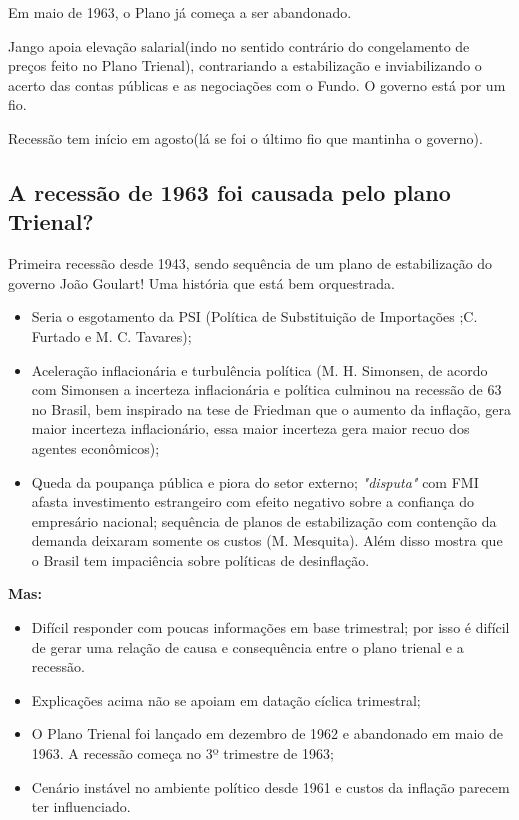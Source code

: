 \documentclass[a4paper,12pt]{article}[abntex2]
\begin{document}
Em maio de 1963, o Plano já começa a ser abandonado. 

Jango apoia elevação salarial(indo no sentido contrário do congelamento de preços feito no Plano Trienal), contrariando a estabilização e inviabilizando o acerto das contas públicas e as negociações com o Fundo. O governo está por um fio. 

Recessão tem início em agosto(lá se foi o último fio que mantinha o governo).

\subsection{\textbf{A recessão de 1963 foi causada pelo plano Trienal?}}
    
Primeira recessão desde 1943, sendo sequência de um plano de estabilização do governo João Goulart! Uma história que está bem orquestrada.

\begin{itemize}
    \item Seria o esgotamento da PSI (Política de Substituição de Importações ;C. Furtado e M. C. Tavares);
    \item Aceleração inflacionária e turbulência política (M. H. Simonsen, de acordo com Simonsen a incerteza inflacionária e política culminou na recessão de 63 no Brasil, bem inspirado na tese de Friedman que o aumento da inflação, gera maior incerteza inflacionário, essa maior incerteza gera maior recuo dos agentes econômicos);
    \item Queda da poupança pública e piora do setor externo; \textit{"disputa"} com FMI afasta investimento estrangeiro com efeito negativo sobre a confiança do empresário nacional; sequência de planos de estabilização com contenção da demanda deixaram somente os custos (M. Mesquita). Além disso mostra que o Brasil tem impaciência sobre políticas de desinflação.
\end{itemize}

\textbf{Mas:}
\begin{itemize}
    \item Difícil responder com poucas informações em base trimestral; por isso é difícil de gerar uma relação de causa e consequência entre o plano trienal e a recessão.
    \item Explicações acima não se apoiam em datação cíclica trimestral;
    \item O Plano Trienal foi lançado em dezembro de 1962 e abandonado em maio de 1963. A recessão começa no 3º trimestre de 1963;
    \item Cenário instável no ambiente político desde 1961 e custos da inflação parecem ter influenciado.
\end{itemize}
\end{document}
